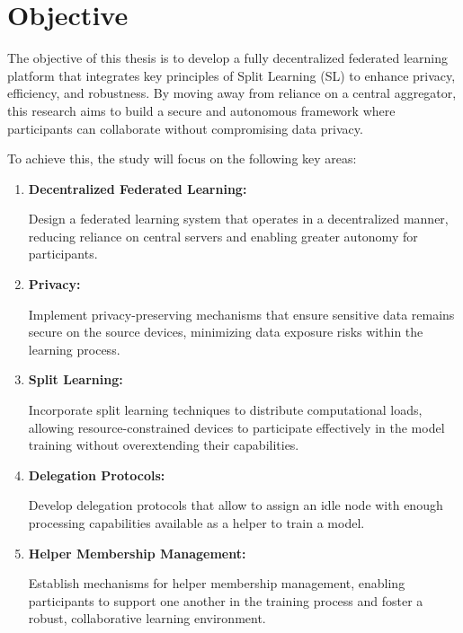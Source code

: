 \section{Objective}
\label{sub:time_is_money}

The objective of this thesis is to develop a fully decentralized federated learning platform that integrates key principles of Split Learning (SL) to enhance privacy, efficiency, and robustness. By moving away from reliance on a central aggregator, this research aims to build a secure and autonomous framework where participants can collaborate without compromising data privacy.


To achieve this, the study will focus on the following key areas:

\begin{enumerate}

 \item \textbf{Decentralized Federated Learning:} 
 
 Design a federated learning system that operates in a decentralized manner, reducing reliance on central servers and enabling greater autonomy for participants.
 
 \item \textbf{Privacy:}
 
 Implement privacy-preserving mechanisms that ensure sensitive data remains secure on the source devices, minimizing data exposure risks within the learning process.

 
 \item \textbf{Split Learning:} 
 
 Incorporate split learning techniques to distribute computational loads, allowing resource-constrained devices to participate effectively in the model training without overextending their capabilities.

 
 \item \textbf{Delegation Protocols:}  
 
 Develop delegation protocols that allow to assign an idle node with enough processing capabilities available as a helper to train a model.

\item \textbf{Helper Membership Management:}
 
Establish mechanisms for helper membership management, enabling participants to support one another in the training process and foster a robust, collaborative learning environment.


\end{enumerate}

